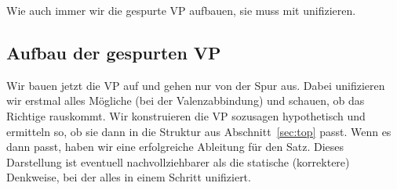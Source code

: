 \documentclass[10pt,a3paper]{article}
\newcommand{\rot}[1]{\textcolor{rot}{#1}}
\newcommand{\blau}[1]{\textcolor{blau}{#1}}
\newcommand{\orongsch}[1]{\textcolor{orongsch}{#1}}
\newcommand{\tuerkis}[1]{\textcolor{tuerkis}{#1}}
\newcommand*{\mybox}[1]{\framebox{#1}}
\newcommand{\Sub}[1]{\ensuremath{_{\text{#1}}}}
\newcommand{\Zeile}{\vspace{\baselineskip}}
\begin{document}

\Zeile

Wie auch immer wir die gespurte VP aufbauen, sie muss mit \orongsch{\mybox{2}} unifizieren.

\subsection{Aufbau der gespurten VP}\label{sec:vp}

Wir bauen jetzt die VP auf und gehen nur von der Spur aus.
Dabei unifizieren wir erstmal alles Mögliche (bei der Valenzabbindung) und schauen, ob das Richtige rauskommt.
Wir konstruieren die VP sozusagen hypothetisch und ermitteln so, ob sie dann in die Struktur aus Abschnitt~\ref{sec:top} passt. 
Wenn es dann passt, haben wir eine erfolgreiche Ableitung für den Satz.
Dieses Darstellung ist eventuell nachvollziehbarer als die statische (korrektere) Denkweise, bei der alles in einem Schritt unifiziert.
\end{document}
